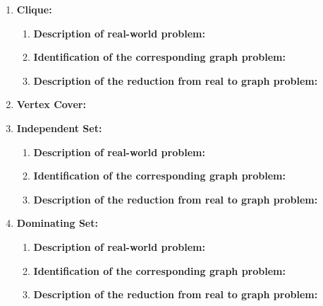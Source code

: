 \documentclass[article, 10pt,onecolumn]{article}
\begin{document}
\begin{enumerate}
\item \textbf{Clique:}
 \begin{enumerate}
   \item \textbf{Description of real-world problem:} 
   \item \textbf{Identification of the corresponding graph problem:} 
   \item \textbf{Description of the reduction from real to graph problem:} 
  \end{enumerate}
  
\item \textbf{Vertex Cover:}

\item \textbf{Independent Set:}
 \begin{enumerate}
   \item \textbf{Description of real-world problem:} 
   \item \textbf{Identification of the corresponding graph problem:} 
   \item \textbf{Description of the reduction from real to graph problem:} 
  \end{enumerate}
  
\item \textbf{Dominating Set:}
 \begin{enumerate}
   \item \textbf{Description of real-world problem:} 
   \item \textbf{Identification of the corresponding graph problem:} 
   \item \textbf{Description of the reduction from real to graph problem:} 
  \end{enumerate}
  

\end{enumerate}
\end{document}
